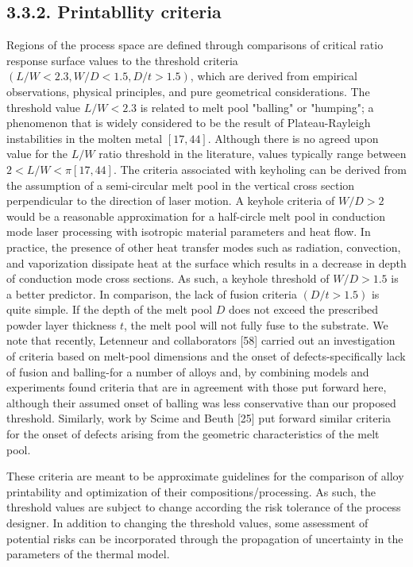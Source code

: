 \documentclass[10pt]{article}
\begin{document}
\subsection*{3.3.2. Printabllity criteria}
Regions of the process space are defined through comparisons of critical ratio response surface values to the threshold criteria $(L / W<2.3, W / D<1.5, D / t>1.5)$, which are derived from empirical observations, physical principles, and pure geometrical considerations. The threshold value $L / W<2.3$ is related to melt pool "balling" or "humping"; a phenomenon that is widely considered to be the result of Plateau-Rayleigh instabilities in the molten metal $[17,44]$. Although there is no agreed upon value for the $L / W$ ratio threshold in the literature, values typically range between $2<L / W<\pi[17,44]$. The criteria associated with keyholing can be derived from the assumption of a semi-circular melt pool in the vertical cross section perpendicular to the direction of laser motion. A keyhole criteria of $W / D>2$ would be a reasonable approximation for a half-circle melt pool in conduction mode laser processing with isotropic material parameters and heat flow. In practice, the presence of other heat transfer modes such as radiation, convection, and vaporization dissipate heat at the surface which results in a decrease in depth of conduction mode cross sections. As such, a keyhole threshold of $W / D>1.5$ is a better predictor. In comparison, the lack of fusion criteria $(D / t>1.5)$ is quite simple. If the depth of the melt pool $D$ does not exceed the prescribed powder layer thickness $t$, the melt pool will not fully fuse to the substrate. We note that recently, Letenneur and collaborators [58] carried out an investigation of criteria based on melt-pool dimensions and the onset of defects-specifically lack of fusion and balling-for a number of alloys and, by combining models and experiments found criteria that are in agreement with those put forward here, although their assumed onset of balling was less conservative than our proposed threshold. Similarly, work by Scime and Beuth [25] put forward similar criteria for the onset of defects arising from the geometric characteristics of the melt pool.

These criteria are meant to be approximate guidelines for the comparison of alloy printability and optimization of their compositions/processing. As such, the threshold values are subject to change according the risk tolerance of the process designer. In addition to changing the threshold values, some assessment of potential risks can be incorporated through the propagation of uncertainty in the parameters of the thermal model.
\end{document}
